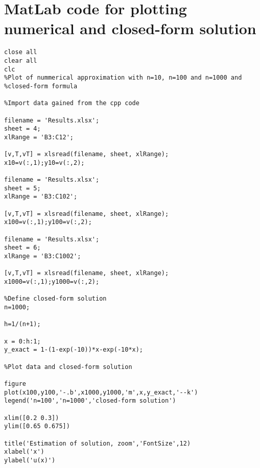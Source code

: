 \chapter{MatLab code for plotting numerical and closed-form solution}
\label{app:MatLabSolution}
\lstset{language=Matlab}
\begin{lstlisting}
close all
clear all
clc
%Plot of nummerical approximation with n=10, n=100 and n=1000 and
%closed-form formula

%Import data gained from the cpp code

filename = 'Results.xlsx';
sheet = 4;
xlRange = 'B3:C12';

[v,T,vT] = xlsread(filename, sheet, xlRange);
x10=v(:,1);y10=v(:,2);

filename = 'Results.xlsx';
sheet = 5;
xlRange = 'B3:C102';

[v,T,vT] = xlsread(filename, sheet, xlRange);
x100=v(:,1);y100=v(:,2);

filename = 'Results.xlsx';
sheet = 6;
xlRange = 'B3:C1002';

[v,T,vT] = xlsread(filename, sheet, xlRange);
x1000=v(:,1);y1000=v(:,2);

%Define closed-form solution
n=1000;

h=1/(n+1);

x = 0:h:1;
y_exact = 1-(1-exp(-10))*x-exp(-10*x);

%Plot data and closed-form solution

figure
plot(x100,y100,'-.b',x1000,y1000,'m',x,y_exact,'--k')
legend('n=100','n=1000','closed-form solution')

xlim([0.2 0.3])
ylim([0.65 0.675])

title('Estimation of solution, zoom','FontSize',12)
xlabel('x')
ylabel('u(x)')
\end{lstlisting}